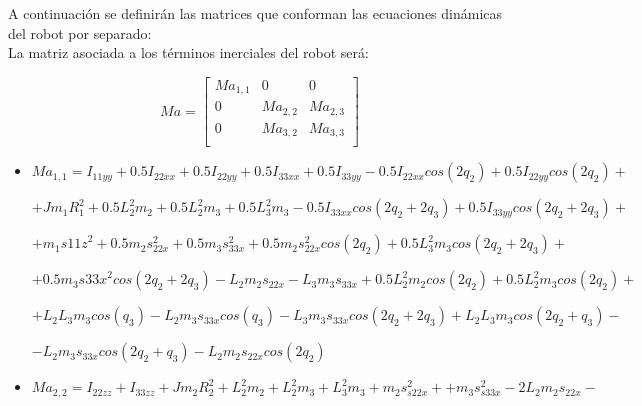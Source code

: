 A continuación se definirán las matrices que conforman las ecuaciones dinámicas del robot por separado: \\

La matriz asociada a los términos inerciales del robot será:

\[
Ma=
\begin{bmatrix}
Ma_{1,1} & 0 & 0\\

0 & Ma_{2,2} & Ma_{2,3}\\

0 & Ma_{3,2} & Ma_{3,3}\\
\end{bmatrix} \]



\begin{itemize}
	
	\item $Ma_{1,1}= I_{11yy}+0.5I_{22xx}+0.5I_{22yy}+0.5I_{33xx} +0.5I_{33yy} - 0.5I_{22xx}cos(2q_{2})+0.5I_{22yy}cos(2q_2) +$ \\ \vspace{0.1cm}
	
	$+ Jm_1R_{1}^{2} + 0.5L_{2}^{2}m_{2} +0.5L_{2}^{2}m_{3}+ 0.5L_{3}^{2}m_{3}- 0.5I_{33xx}cos(2q_{2} + 2q_{3}) +0.5I_{33yy}cos(2q_{2} + 2q_{3}) +$ \\ \vspace{0.1cm}
	
	$+ m_{1}s{11z}^{2} + 0.5m_{2}s_{22x}^{2}+ 0.5m_{3}s_{33x}^{2}+ 0.5m_{2}s_{22x}^{2}cos(2q_{2})+ 0.5L_{3}^{2}m_{3}cos(2q_{2} + 2q_{3})+ $ \\ \vspace{0.1cm}
	
	$+ 0.5m_{3}s{33x}^{2}cos(2q_{2}+2q_{3}) - L_{2}m_{2}s_{22x}- L_{3}m_{3}s_{33x} + 0.5L_{2}^{2}m_{2}cos(2q_{2})+ 0.5L_{2}^{2}m_{3}cos(2q_{2})+ $ \\ \vspace{0.1cm}
	
	$+ L_{2}L_{3}m_{3}cos(q_{3}) -L_{2}m_{3}s_{33x}cos(q_{3})- L_{3}m_{3}s_{33x}cos(2q_{2} + 2q_{3})+L_{2}L_{3}m_{3}cos(2q_{2} + q_{3}) - $ \\ \vspace{0.1cm}
	
	$- L_{2}m_{3}s_{33x}cos(2q_{2} + q_{3})-L_{2}m_{2}s_{22x}cos(2q_{2})$ \\ \vspace{0.2cm}
	
	\item $Ma_{2,2}=I_{22zz}+I_{33zz}+Jm_{2}R_{2}^{2}+L_{2}^{2}m_{2}+L_{2}^{2}m_{3}+L_{3}^{2}m_{3}+m_{2}s_{s22x}^{2}++m_{3}s_{s33x}^{2}- 2L_{2}m_{2}s_{22x} - $ \\ \vspace{0.1cm}
	

\end{itemize}
